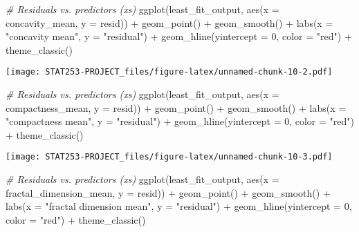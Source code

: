 \documentclass[
]{article}
\newenvironment{Shaded}{\begin{snugshade}}{\end{snugshade}}
\newcommand{\AttributeTok}[1]{\textcolor[rgb]{0.77,0.63,0.00}{#1}}
\newcommand{\CommentTok}[1]{\textcolor[rgb]{0.56,0.35,0.01}{\textit{#1}}}
\newcommand{\DecValTok}[1]{\textcolor[rgb]{0.00,0.00,0.81}{#1}}
\newcommand{\FunctionTok}[1]{\textcolor[rgb]{0.00,0.00,0.00}{#1}}
\newcommand{\NormalTok}[1]{#1}
\newcommand{\SpecialCharTok}[1]{\textcolor[rgb]{0.00,0.00,0.00}{#1}}
\newcommand{\StringTok}[1]{\textcolor[rgb]{0.31,0.60,0.02}{#1}}
\begin{document}
\begin{Shaded}
\begin{Highlighting}[]
\CommentTok{\# Residuals vs. predictors (x\textquotesingle{}s) }
\FunctionTok{ggplot}\NormalTok{(least\_fit\_output, }\FunctionTok{aes}\NormalTok{(}\AttributeTok{x =}\NormalTok{ concavity\_mean, }\AttributeTok{y =}\NormalTok{ resid)) }\SpecialCharTok{+}
  \FunctionTok{geom\_point}\NormalTok{() }\SpecialCharTok{+}
  \FunctionTok{geom\_smooth}\NormalTok{() }\SpecialCharTok{+}
  \FunctionTok{labs}\NormalTok{(}\AttributeTok{x =} \StringTok{"concavity mean"}\NormalTok{, }\AttributeTok{y =} \StringTok{"residual"}\NormalTok{) }\SpecialCharTok{+}
  \FunctionTok{geom\_hline}\NormalTok{(}\AttributeTok{yintercept =} \DecValTok{0}\NormalTok{, }\AttributeTok{color =} \StringTok{"red"}\NormalTok{) }\SpecialCharTok{+}
  \FunctionTok{theme\_classic}\NormalTok{()}
\end{Highlighting}
\end{Shaded}

\texttt{[image: STAT253-PROJECT\_files/figure-latex/unnamed-chunk-10-2.pdf]}

\begin{Shaded}
\begin{Highlighting}[]
\CommentTok{\# Residuals vs. predictors (x\textquotesingle{}s) }
\FunctionTok{ggplot}\NormalTok{(least\_fit\_output, }\FunctionTok{aes}\NormalTok{(}\AttributeTok{x =}\NormalTok{ compactness\_mean, }\AttributeTok{y =}\NormalTok{ resid)) }\SpecialCharTok{+}
  \FunctionTok{geom\_point}\NormalTok{() }\SpecialCharTok{+}
  \FunctionTok{geom\_smooth}\NormalTok{() }\SpecialCharTok{+}
  \FunctionTok{labs}\NormalTok{(}\AttributeTok{x =} \StringTok{"compactness mean"}\NormalTok{, }\AttributeTok{y =} \StringTok{"residual"}\NormalTok{) }\SpecialCharTok{+}
  \FunctionTok{geom\_hline}\NormalTok{(}\AttributeTok{yintercept =} \DecValTok{0}\NormalTok{, }\AttributeTok{color =} \StringTok{"red"}\NormalTok{) }\SpecialCharTok{+}
  \FunctionTok{theme\_classic}\NormalTok{()}
\end{Highlighting}
\end{Shaded}

\texttt{[image: STAT253-PROJECT\_files/figure-latex/unnamed-chunk-10-3.pdf]}

\begin{Shaded}
\begin{Highlighting}[]
\CommentTok{\# Residuals vs. predictors (x\textquotesingle{}s) }
\FunctionTok{ggplot}\NormalTok{(least\_fit\_output, }\FunctionTok{aes}\NormalTok{(}\AttributeTok{x =}\NormalTok{ fractal\_dimension\_mean, }\AttributeTok{y =}\NormalTok{ resid)) }\SpecialCharTok{+}
  \FunctionTok{geom\_point}\NormalTok{() }\SpecialCharTok{+}
  \FunctionTok{geom\_smooth}\NormalTok{() }\SpecialCharTok{+}
  \FunctionTok{labs}\NormalTok{(}\AttributeTok{x =} \StringTok{"fractal dimension mean"}\NormalTok{, }\AttributeTok{y =} \StringTok{"residual"}\NormalTok{) }\SpecialCharTok{+}
  \FunctionTok{geom\_hline}\NormalTok{(}\AttributeTok{yintercept =} \DecValTok{0}\NormalTok{, }\AttributeTok{color =} \StringTok{"red"}\NormalTok{) }\SpecialCharTok{+}
  \FunctionTok{theme\_classic}\NormalTok{()}
\end{Highlighting}
\end{Shaded}
\end{document}
